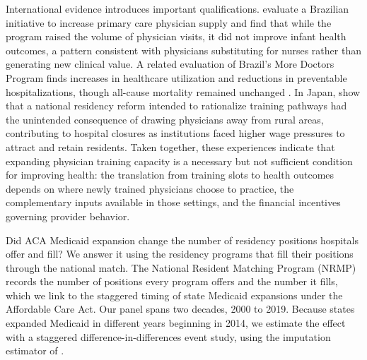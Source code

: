 International evidence introduces important qualifications. \textcite{carrillo2019} evaluate a Brazilian initiative to increase primary care physician supply and find that while the program raised the volume of physician visits, it did not improve infant health outcomes, a pattern consistent with physicians substituting for nurses rather than generating new clinical value. A related evaluation of Brazil's More Doctors Program finds increases in healthcare utilization and reductions in preventable hospitalizations, though all-cause mortality remained unchanged \autocite{mattos2019}. In Japan, \textcite{iizuka2016} show that a national residency reform intended to rationalize training pathways had the unintended consequence of drawing physicians away from rural areas, contributing to hospital closures as institutions faced higher wage pressures to attract and retain residents. Taken together, these experiences indicate that expanding physician training capacity is a necessary but not sufficient condition for improving health: the translation from training slots to health outcomes depends on where newly trained physicians choose to practice, the complementary inputs available in those settings, and the financial incentives governing provider behavior.

Did ACA Medicaid expansion change the number of residency positions hospitals offer and fill? We answer it using the residency programs that fill their positions through the national match. The National Resident Matching Program (NRMP) records the number of positions every program offers and the number it fills, which we link to the staggered timing of state Medicaid expansions under the Affordable Care Act. Our panel spans two decades, 2000 to 2019. Because states expanded Medicaid in different years beginning in 2014, we estimate the effect with a staggered difference-in-differences event study, using the imputation estimator of \textcite{borusyak2024revisiting}. 

